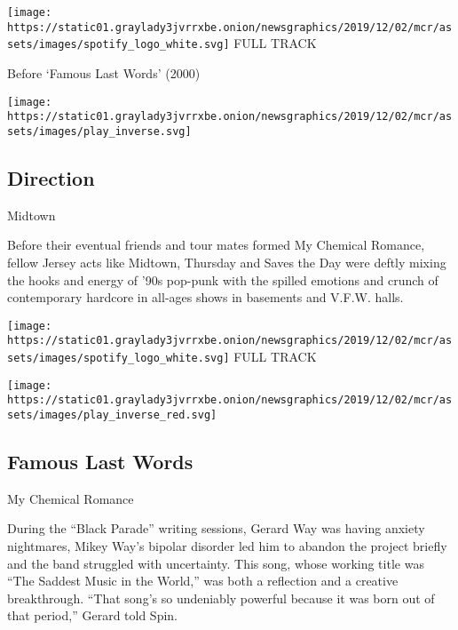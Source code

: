 \href{https://open.spotify.com/track/5755HZdBGvzWebjkuGjMZW?si=3-IrU4H0SAmxrciXoj-s8Q}{}

\texttt{[image: https://static01.graylady3jvrrxbe.onion/newsgraphics/2019/12/02/mcr/assets/images/spotify\_logo\_white.svg]}
FULL TRACK

Before `Famous Last Words' (2000)

\texttt{[image: https://static01.graylady3jvrrxbe.onion/newsgraphics/2019/12/02/mcr/assets/images/play\_inverse.svg]}

\hypertarget{direction}{%
\subsection{Direction}\label{direction}}

Midtown

Before their eventual friends and tour mates formed My Chemical Romance,
fellow Jersey acts like Midtown, Thursday and Saves the Day were deftly
mixing the hooks and energy of '90s pop-punk with the spilled emotions
and crunch of contemporary hardcore in all-ages shows in basements and
V.F.W. halls.

\href{https://open.spotify.com/track/07S5TQgCK4wtNWulY3KiZD?si=KVlQ03jeRWCRjG249SSVDg}{}

\texttt{[image: https://static01.graylady3jvrrxbe.onion/newsgraphics/2019/12/02/mcr/assets/images/spotify\_logo\_white.svg]}
FULL TRACK

\texttt{[image: https://static01.graylady3jvrrxbe.onion/newsgraphics/2019/12/02/mcr/assets/images/play\_inverse\_red.svg]}

\hypertarget{famous-last-words-1}{%
\subsection{Famous Last Words}\label{famous-last-words-1}}

My Chemical Romance

During the ``Black Parade'' writing sessions, Gerard Way was having
anxiety nightmares, Mikey Way's bipolar disorder led him to abandon the
project briefly and the band struggled with uncertainty. This song,
whose working title was ``The Saddest Music in the World,'' was both a
reflection and a creative breakthrough. ``That song's so undeniably
powerful because it was born out of that period,'' Gerard told Spin.

\href{https://open.spotify.com/track/2d6m2F4I7wCuAKtSsdhh83?si=qZz-of2jSPKrLaWvO7Dqtg}{}

